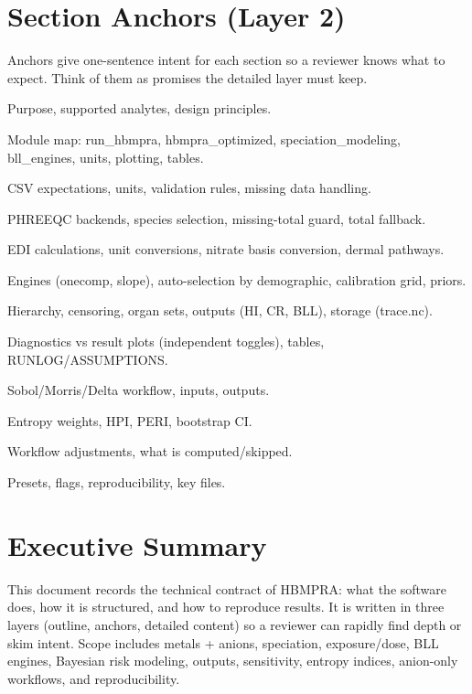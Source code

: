 \documentclass[11pt,a4paper]{article}
\begin{document}
\section*{Section Anchors (Layer 2)}
Anchors give one-sentence intent for each section so a reviewer knows what to expect. Think of them as promises the detailed layer must keep.
\begin{description}[leftmargin=1.2cm,labelindent=0cm]
  \item[Intro] Purpose, supported analytes, design principles.
  \item[Architecture] Module map: run\_hbmpra, hbmpra\_optimized, speciation\_modeling, bll\_engines, units, plotting, tables.
  \item[Input] CSV expectations, units, validation rules, missing data handling.
  \item[Speciation] PHREEQC backends, species selection, missing-total guard, total fallback.
  \item[Exposure] EDI calculations, unit conversions, nitrate basis conversion, dermal pathways.
  \item[BLL] Engines (onecomp, slope), auto-selection by demographic, calibration grid, priors.
  \item[Bayesian Model] Hierarchy, censoring, organ sets, outputs (HI, CR, BLL), storage (trace.nc).
  \item[Outputs] Diagnostics vs result plots (independent toggles), tables, RUNLOG/ASSUMPTIONS.
  \item[Sensitivity] Sobol/Morris/Delta workflow, inputs, outputs.
  \item[Entropy] Entropy weights, HPI, PERI, bootstrap CI.
  \item[Anion-only] Workflow adjustments, what is computed/skipped.
  \item[CLI/Config] Presets, flags, reproducibility, key files.
\end{description}
\clearpage

\section{Executive Summary}
This document records the technical contract of HBMPRA: what the software does, how it is structured, and how to reproduce results. It is written in three layers (outline, anchors, detailed content) so a reviewer can rapidly find depth or skim intent. Scope includes metals + anions, speciation, exposure/dose, BLL engines, Bayesian risk modeling, outputs, sensitivity, entropy indices, anion-only workflows, and reproducibility.
\end{document}
